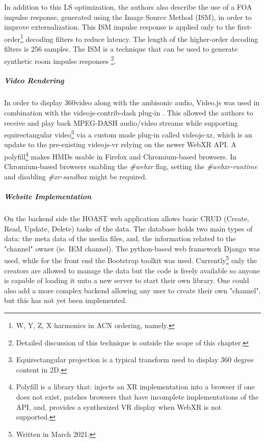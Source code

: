 In addition to this LS optimization, the authors also describe the use of a FOA impulse response, generated using the Image Source Method (ISM), in order to improve externalization. This ISM impulse response is applied only to the first-order\footnote{W, Y, Z, X harmonics in ACN ordering, namely.} decoding filters to reduce latency. The length of the higher-order decoding filters is 256 samples. The ISM is a technique that can be used to generate synthetic room impulse responses \cite{allen1979image}\footnote{Detailed discussion of this technique is outside the scope of this chapter.}. 

\subparagraph{Video Rendering}

In order to display 360\textdegree video along with the ambisonic audio, Video.js was used in combination with the videojs-contrib-dash plug-in \cite{deppisch2020hoast}. This allowed the authors to receive and play back MPEG-DASH audio/video streams while supporting equirectangular video\footnote{Equirectangular projection is a typical transform used to display 360 degree content in 2D.} via a custom made plug-in called videojs-xr, which is an update to the pre-existing videojs-vr relying on the newer WebXR API. A polyfill\footnote{Polyfill is a library that: injects an XR implementation into a browser if one does not exist, patches browsers that have incomplete implementations of the API, and, provides a synthesized VR display when WebXR is not supported.} makes HMDs usable in Firefox and Chromium-based browsers. In Chromium-based browsers enabling the \textit{\#webxr} flag, setting the \textit{\#webxr-runtime} and disabling \textit{\#xr-sandbox} might be required.

\subparagraph{Website Implementation}

On the backend side the HOAST web application allows basic CRUD (Create, Read, Update, Delete) tasks of the data. The database holds two main types of data: the meta data of the media files, and, the information related to the "channel" owner (ie. IEM channel). The python-based web framework Django was used, while for the front end the Bootstrap toolkit was used. Currently\footnote{Written in March 2021.} only the creators are allowed to manage the data but the code is freely available so anyone is capable of loading it unto a new server to start their own library. One could also add a more complex backend allowing any user to create their own "channel", but this has not yet been implemented.


